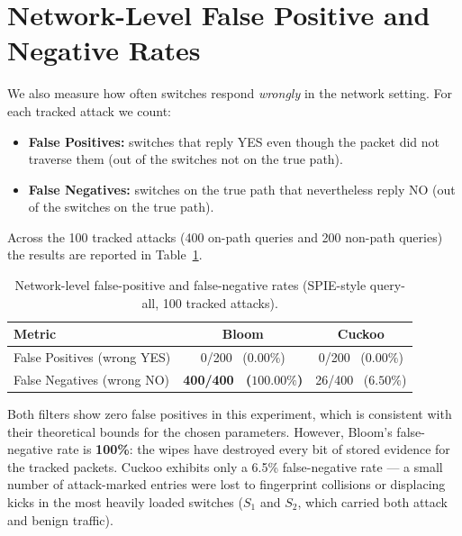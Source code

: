 \documentclass[12pt, a4paper]{report}
\begin{document}
\section{Network-Level False Positive and Negative Rates}

We also measure how often switches respond \textit{wrongly} in the
network setting. For each tracked attack we count:

\begin{itemize}[leftmargin=*]
  \item \textbf{False Positives:} switches that reply YES even though
  the packet did not traverse them (out of the switches not on the
  true path).
  \item \textbf{False Negatives:} switches on the true path that
  nevertheless reply NO (out of the switches on the true path).
\end{itemize}

Across the 100 tracked attacks (400 on-path queries and 200 non-path
queries) the results are reported in Table~\ref{tab:fp-fn}.

\begin{table}[H]
\centering
\caption{Network-level false-positive and false-negative rates
(SPIE-style query-all, 100 tracked attacks).}
\label{tab:fp-fn}
\begin{tabular}{lcc}
\toprule
\textbf{Metric} & \textbf{Bloom} & \textbf{Cuckoo} \\
\midrule
False Positives (wrong YES) & 0/200 \ ($0.00\%$) & 0/200 \ ($0.00\%$) \\
False Negatives (wrong NO)  & \textbf{400/400 \ ($100.00\%$)}
                            & 26/400 \ ($6.50\%$) \\
\bottomrule
\end{tabular}
\end{table}

Both filters show zero false positives in this experiment, which is
consistent with their theoretical bounds for the chosen parameters.
However, Bloom's false-negative rate is \textbf{100\%}: the wipes have
destroyed every bit of stored evidence for the tracked packets. Cuckoo
exhibits only a 6.5\% false-negative rate --- a small number of
attack-marked entries were lost to fingerprint collisions or displacing
kicks in the most heavily loaded switches ($S_1$ and $S_2$, which
carried both attack and benign traffic).

\end{document}
